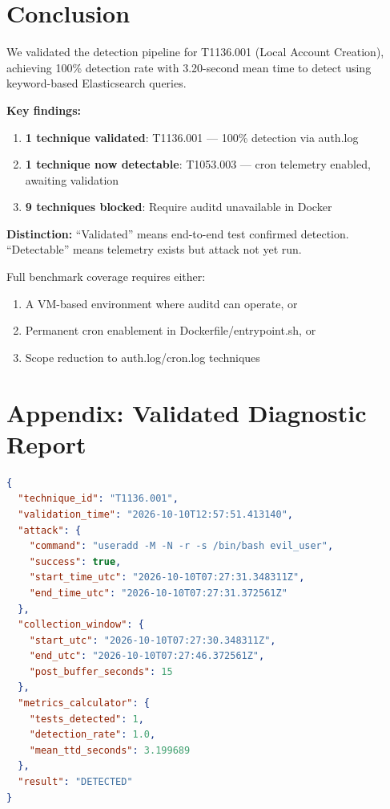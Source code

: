 \documentclass[11pt,a4paper]{article}
\begin{document}
\section{Conclusion}

We validated the detection pipeline for T1136.001 (Local Account Creation), achieving 100\% detection rate with 3.20-second mean time to detect using keyword-based Elasticsearch queries.

\textbf{Key findings:}
\begin{enumerate}
    \item \textbf{1 technique validated}: T1136.001 --- 100\% detection via auth.log
    \item \textbf{1 technique now detectable}: T1053.003 --- cron telemetry enabled, awaiting validation
    \item \textbf{9 techniques blocked}: Require auditd unavailable in Docker
\end{enumerate}

\textbf{Distinction:} ``Validated'' means end-to-end test confirmed detection. ``Detectable'' means telemetry exists but attack not yet run.

Full benchmark coverage requires either:
\begin{enumerate}
    \item A VM-based environment where auditd can operate, or
    \item Permanent cron enablement in Dockerfile/entrypoint.sh, or
    \item Scope reduction to auth.log/cron.log techniques
\end{enumerate}

\section*{Appendix: Validated Diagnostic Report}

\begin{lstlisting}[language=json,caption={validation\_20261010\_125751.json}]
{
  "technique_id": "T1136.001",
  "validation_time": "2026-10-10T12:57:51.413140",
  "attack": {
    "command": "useradd -M -N -r -s /bin/bash evil_user",
    "success": true,
    "start_time_utc": "2026-10-10T07:27:31.348311Z",
    "end_time_utc": "2026-10-10T07:27:31.372561Z"
  },
  "collection_window": {
    "start_utc": "2026-10-10T07:27:30.348311Z",
    "end_utc": "2026-10-10T07:27:46.372561Z",
    "post_buffer_seconds": 15
  },
  "metrics_calculator": {
    "tests_detected": 1,
    "detection_rate": 1.0,
    "mean_ttd_seconds": 3.199689
  },
  "result": "DETECTED"
}
\end{lstlisting}
\end{document}
